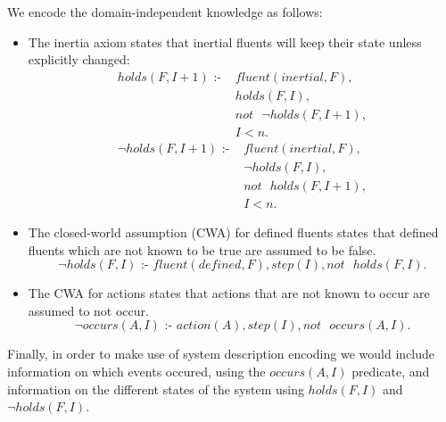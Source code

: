 \documentclass[../interim.tex]{subfiles}
\begin{document}
\noindent
We encode the domain-independent knowledge as follows:
\begin{itemize}
  \item The inertia axiom states that inertial fluents will keep their state unless explicitly changed:
  \begin{equation}
    \begin{split}
      holds(F, I+1) \text{ :- } &fluent(inertial, F), \\
      &holds(F, I), \\
      &not \text{ } \neg holds(F, I+1), \\
      &I < n.
    \end{split}
  \end{equation}
  \begin{equation}
    \begin{split}
      \neg holds(F, I+1) \text{ :- } &fluent(inertial, F), \\
      &\neg holds(F, I), \\
      &not \text{ } holds(F, I+1), \\
      &I < n.
    \end{split}
  \end{equation}

  \item The closed-world assumption (CWA) for defined fluents states that defined fluents which are not known to be true are assumed to be false.
  \begin{equation}
    \neg holds(F, I) \text{ :- } fluent(defined, F), step(I), not \text{ } holds(F, I).
  \end{equation}

  \item The CWA for actions states that actions that are not known to occur are assumed to not occur.
  \begin{equation}
    \neg occurs(A, I) \text{ :- } action(A), step(I), not \text{ } occurs(A, I).
  \end{equation}
\end{itemize}

Finally, in order to make use of system description encoding we would include information on which events occured, using the $occurs(A, I)$ predicate, and information on the different states of the system using $holds(F, I)$ and $\neg holds(F, I)$.
\end{document}
